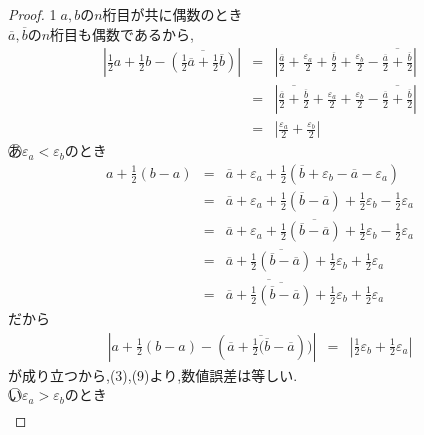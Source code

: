 \documentclass[14pt]{jsarticle}
\theoremstyle{definition}
\begin{document}
\begin{proof}
\textcircled{\scriptsize 1}$a,b$の$n$桁目が共に偶数のとき\\
$\overline a, \overline b$の$n$桁目も偶数であるから,
\begin{eqnarray}
\left| \frac{1}{2}a + \frac{1}{2}b - \overline{(\frac{1}{2}\overline a + \frac{1}{2}\overline b)} \right| &=&
\left| \frac{\overline a}{2} + \frac{\varepsilon_a}{2} + \frac{\overline b}{2} + \frac{\varepsilon_b}{2} 
     - \overline{\frac{\overline a}{2} + \frac{\overline b}{2}} \right| \\ &=& 
\left| \overline{\frac{\overline a}{2} + \frac{\overline b}{2}}
     + \frac{\varepsilon_a}{2} + \frac{\varepsilon_b}{2}
     - \overline{\frac{\overline a}{2} + \frac{\overline b}{2}} \right| \\ &=&
\left| \frac{\varepsilon_a}{2} +\frac{\varepsilon_b}{2} \right| 
\end{eqnarray}
\textcircled{\scriptsize あ}$\varepsilon_a < \varepsilon_b$のとき
\begin{eqnarray}
a + \frac{1}{2}(b - a) &=& \overline a + \varepsilon_a + \frac{1}{2}(\overline b + \varepsilon_b - \overline a - \varepsilon_a) \\
                       &=& \overline a + \varepsilon_a
                         + \frac{1}{2}(\overline b - \overline a) + \frac{1}{2}\varepsilon_b - \frac{1}{2}\varepsilon_a \\
		       &=& \overline a + \varepsilon_a
                         + \frac{1}{2}\overline{(\overline b - \overline a)} 
                         + \frac{1}{2}\varepsilon_b - \frac{1}{2}\varepsilon_a \\
                       &=& \overline a 
                         + \overline{\frac{1}{2}(\overline b - \overline a)} 
                         + \frac{1}{2}\varepsilon_b + \frac{1}{2}\varepsilon_a \\
		       &=& \overline{\overline a 
                         + \overline{\frac{1}{2}(\overline b - \overline a)}}
                         + \frac{1}{2}\varepsilon_b + \frac{1}{2}\varepsilon_a
\end{eqnarray}
だから
\begin{eqnarray}
\left| a + \frac{1}{2}(b - a) - (\overline{\overline a + \frac{1}{2}(\overline b - \overline a})) \right| &=&
\left| \frac{1}{2}\varepsilon_b + \frac{1}{2}\varepsilon_a \right|
\end{eqnarray}
が成り立つから,(3),(9)より,数値誤差は等しい.\\
\textcircled{\scriptsize い}$\varepsilon_a > \varepsilon_b$のとき
\begin{eqnarray}

\end{eqnarray}
\end{proof}
\end{document}
